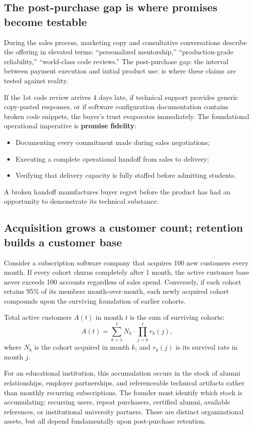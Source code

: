 \subsection{The post-purchase gap is where promises become testable}

During the sales process, marketing copy and consultative conversations describe the offering in elevated terms: ``personalized mentorship,'' ``production-grade reliability,'' ``world-class code reviews.'' The post-purchase gap: the interval between payment execution and initial product use: is where these claims are tested against reality.

If the 1st code review arrives 4 days late, if technical support provides generic copy-pasted responses, or if software configuration documentation contains broken code snippets, the buyer's trust evaporates immediately. The foundational operational imperative is \textbf{promise fidelity}:
\begin{itemize}
\item Documenting every commitment made during sales negotiations;
\item Executing a complete operational handoff from sales to delivery;
\item Verifying that delivery capacity is fully staffed before admitting students.
\end{itemize}
A broken handoff manufactures buyer regret before the product has had an opportunity to demonstrate its technical substance.

\subsection{Acquisition grows a customer count; retention builds a customer base}

Consider a subscription software company that acquires 100 new customers every month. If every cohort churns completely after 1 month, the active customer base never exceeds 100 accounts regardless of sales spend. Conversely, if each cohort retains 95\% of its members month-over-month, each newly acquired cohort compounds upon the surviving foundation of earlier cohorts.

Total active customers $A(t)$ in month $t$ is the sum of surviving cohorts:
\begin{equation}
A(t) = \sum_{k=1}^{t} N_k \cdot \prod_{j=k}^{t} r_{k}(j),
\end{equation}
where $N_k$ is the cohort acquired in month $k$, and $r_k(j)$ is its survival rate in month $j$.

For an educational institution, this accumulation occurs in the stock of alumni relationships, employer partnerships, and referenceable technical artifacts rather than monthly recurring subscriptions. The founder must identify which stock is accumulating: recurring users, repeat purchasers, certified alumni, available references, or institutional university partners. These are distinct organizational assets, but all depend fundamentally upon post-purchase retention.
